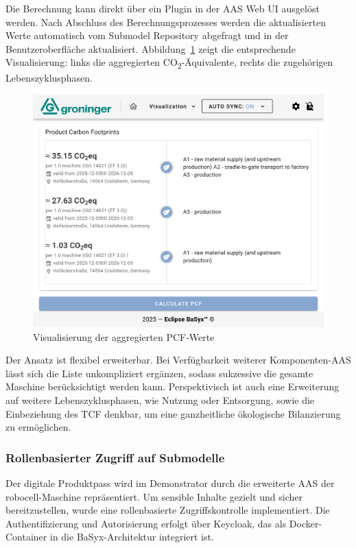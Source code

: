 Die Berechnung kann direkt über ein Plugin in der AAS Web UI ausgelöst werden.
 Nach Abschluss des Berechnungsprozesses werden die aktualisierten Werte automatisch vom Submodel Repository abgefragt und in der Benutzeroberfläche aktualisiert.
Abbildung~\ref{fig:PluginAggregation} zeigt die entsprechende Visualisierung: links die aggregierten CO\textsubscript{2}-Äquivalente, rechts die zugehörigen Lebenszyklusphasen.

\begin{figure}[htbp]
    \centering
        \includegraphics[width=1\textwidth]{Bilder/ErgebnisseAASWebUI/CarbonFootprint.png}
    \caption{Visualisierung der aggregierten PCF-Werte}
    \label{fig:PluginAggregation}
\end{figure}

Der Ansatz ist flexibel erweiterbar.
Bei Verfügbarkeit weiterer Komponenten-AAS lässt sich die Liste unkompliziert ergänzen, sodass sukzessive die gesamte Maschine berücksichtigt werden kann. 
Perspektivisch ist auch eine Erweiterung auf weitere Lebenszyklusphasen, wie Nutzung oder Entsorgung, sowie die Einbeziehung des TCF denkbar, um eine ganzheitliche ökologische Bilanzierung zu ermöglichen.

\subsubsection{Rollenbasierter Zugriff auf Submodelle}
Der digitale Produktpass wird im Demonstrator durch die erweiterte AAS der robocell-Maschine repräsentiert. 
Um sensible Inhalte gezielt und sicher bereitzustellen, wurde eine rollenbasierte Zugriffskontrolle implementiert. 
Die Authentifizierung und Autorisierung erfolgt über Keycloak, das als Docker-Container in die BaSyx-Architektur integriert ist.

